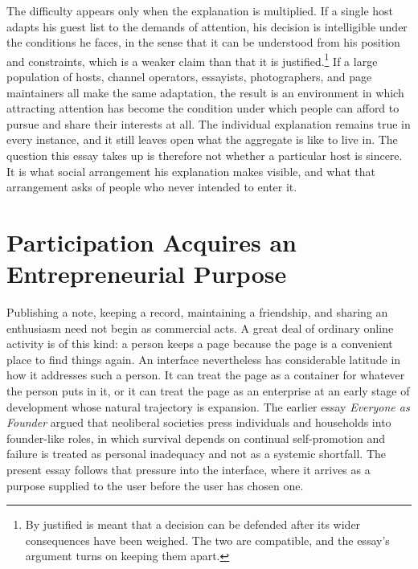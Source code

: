 \documentclass[12pt]{article}
\theoremstyle{plain}
\theoremstyle{definition}
\begin{document}
The difficulty appears only when the explanation is multiplied. If a single host adapts his guest list to the demands of attention, his decision is intelligible under the conditions he faces, in the sense that it can be understood from his position and constraints, which is a weaker claim than that it is justified.\footnote{By justified is meant that a decision can be defended after its wider consequences have been weighed. The two are compatible, and the essay's argument turns on keeping them apart.} If a large population of hosts, channel operators, essayists, photographers, and page maintainers all make the same adaptation, the result is an environment in which attracting attention has become the condition under which people can afford to pursue and share their interests at all. The individual explanation remains true in every instance, and it still leaves open what the aggregate is like to live in. The question this essay takes up is therefore not whether a particular host is sincere. It is what social arrangement his explanation makes visible, and what that arrangement asks of people who never intended to enter it.

\section{Participation Acquires an Entrepreneurial Purpose}

Publishing a note, keeping a record, maintaining a friendship, and sharing an enthusiasm need not begin as commercial acts. A great deal of ordinary online activity is of this kind: a person keeps a page because the page is a convenient place to find things again. An interface nevertheless has considerable latitude in how it addresses such a person. It can treat the page as a container for whatever the person puts in it, or it can treat the page as an enterprise at an early stage of development whose natural trajectory is expansion. The earlier essay \emph{Everyone as Founder} \cite{flyxion2026founder} argued that neoliberal societies press individuals and households into founder-like roles, in which survival depends on continual self-promotion and failure is treated as personal inadequacy and not as a systemic shortfall. The present essay follows that pressure into the interface, where it arrives as a purpose supplied to the user before the user has chosen one.
\end{document}
